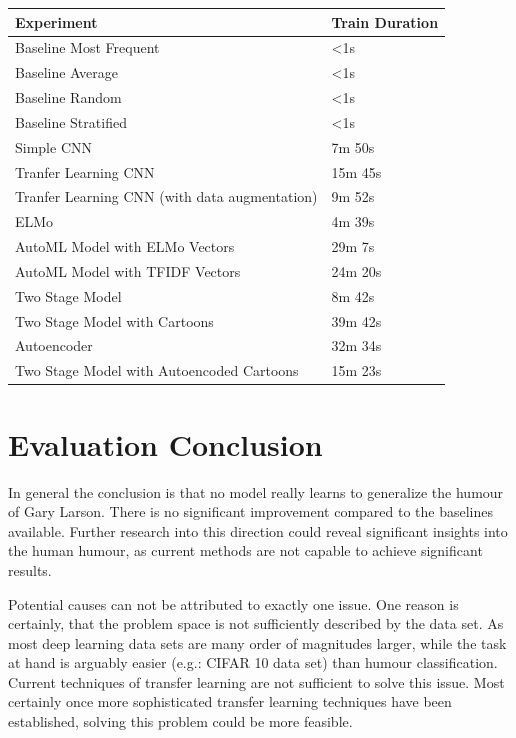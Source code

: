 \documentclass[draft,final,oneside]{vutinfth} %
\begin{document}
\begin{table}
\centering
\begin{tabular}{|l|l|} 
\hline
\textbf{Experiment}                                    & \textbf{Train Duration}  \\ 
\hline
Baseline Most Frequent                        & \textless{}1s   \\
Baseline Average                              & \textless{}1s   \\
Baseline Random                               & \textless{}1s   \\
Baseline Stratified                           & \textless{}1s   \\
Simple CNN                                    & 7m 50s          \\
Tranfer Learning CNN                          & 15m 45s         \\
Tranfer Learning CNN (with data augmentation) & 9m 52s          \\
ELMo                                          & 4m 39s          \\
AutoML Model with ELMo Vectors                & 29m 7s          \\
AutoML Model with TFIDF Vectors               & 24m 20s         \\
Two Stage Model                               & 8m 42s          \\
Two Stage Model with Cartoons                 & 39m 42s         \\
Autoencoder                                   & 32m 34s         \\
Two Stage Model with Autoencoded Cartoons     & 15m 23s         \\
\hline
\end{tabular}
\end{table}

\section{Evaluation Conclusion}

In general the conclusion is that no model really learns to generalize the humour of
Gary Larson. There is no significant improvement compared to the baselines available.
Further research into this direction could reveal significant insights into the human humour, as current methods are not capable to achieve significant results.

Potential causes can not be attributed to exactly one issue. One reason is certainly, that the problem space is not sufficiently described by the data set. As most deep learning data sets are many order of magnitudes larger, while the task at hand is arguably easier (e.g.: CIFAR 10 data set) than humour classification. Current techniques of transfer learning are not sufficient to solve this issue. Most certainly once more sophisticated transfer learning techniques have been established, solving this problem could be more feasible. 
\end{document}
